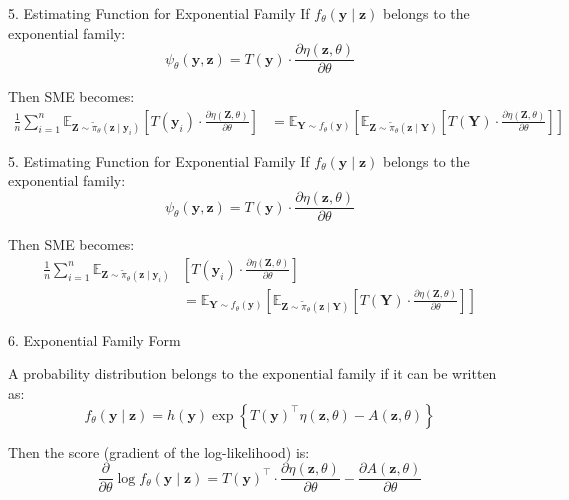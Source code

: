 \documentclass{beamer}
\begin{document}
\begin{frame}{5. Estimating Function for Exponential Family}
If \( f_\theta(\bm{y} \mid \bm{z}) \) belongs to the exponential family:
\begin{equation*}
\psi_\theta(\bm{y}, \bm{z}) 
= T(\bm{y}) \cdot \frac{\partial \eta(\bm{z}, \theta)}{\partial \theta}
\end{equation*}

Then SME becomes:
\begin{align*}
\frac{1}{n} \sum_{i=1}^n 
\mathbb{E}_{\mathbf{Z} \sim \tilde{\pi}_\theta(\bm{z} \mid \bm{y}_i)} 
\left[
T(\bm{y}_i) \cdot 
\frac{\partial \eta(\mathbf{Z}, \theta)}{\partial \theta}
\right]
&=
\mathbb{E}_{\mathbf{Y} \sim f_\theta(\bm{y})}
\left[
\mathbb{E}_{\mathbf{Z} \sim \tilde{\pi}_\theta(\bm{z} \mid \mathbf{Y})} 
\left[
T(\mathbf{Y}) \cdot 
\frac{\partial \eta(\mathbf{Z}, \theta)}{\partial \theta}
\right]
\right]
\end{align*}
\end{frame}


\begin{frame}{5. Estimating Function for Exponential Family}
If \( f_\theta(\bm{y} \mid \bm{z}) \) belongs to the exponential family:
\begin{equation*}
\psi_\theta(\bm{y}, \bm{z}) 
= T(\bm{y}) \cdot \frac{\partial \eta(\bm{z}, \theta)}{\partial \theta}
\end{equation*}

Then SME becomes:
\begin{align*}
\frac{1}{n} \sum_{i=1}^n 
\mathbb{E}_{\mathbf{Z} \sim \tilde{\pi}_\theta(\bm{z} \mid \bm{y}_i)} 
&\left[
T(\bm{y}_i) \cdot 
\frac{\partial \eta(\mathbf{Z}, \theta)}{\partial \theta}
\right] \\
&=
\mathbb{E}_{\mathbf{Y} \sim f_\theta(\bm{y})}
\left[
\mathbb{E}_{\mathbf{Z} \sim \tilde{\pi}_\theta(\bm{z} \mid \mathbf{Y})} 
\left[
T(\mathbf{Y}) \cdot 
\frac{\partial \eta(\mathbf{Z}, \theta)}{\partial \theta}
\right]
\right]
\end{align*}
\end{frame}

\begin{frame}{6. Exponential Family Form}

A probability distribution belongs to the exponential family if it can be written as:
\begin{equation*}
f_\theta(\mathbf{y} \mid \mathbf{z}) 
= h(\mathbf{y}) \exp\left\{
T(\mathbf{y})^\top \eta(\mathbf{z}, \theta) - A(\mathbf{z}, \theta)
\right\}
\end{equation*}

\vspace{1em}

Then the score (gradient of the log-likelihood) is:
\begin{equation*}
\frac{\partial}{\partial \theta} \log f_\theta(\mathbf{y} \mid \mathbf{z}) 
= T(\mathbf{y})^\top \cdot \frac{\partial \eta(\mathbf{z}, \theta)}{\partial \theta}
- \frac{\partial A(\mathbf{z}, \theta)}{\partial \theta}
\end{equation*}

\end{frame}
\end{document}
